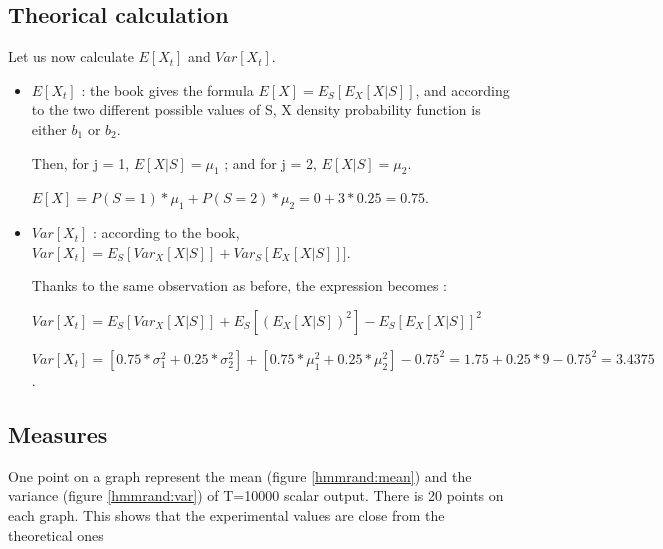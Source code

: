 \documentclass[a4paper]{report}
\begin{document}
\subsection{Theorical calculation}
Let us now calculate $E[X_{t}]$ and $Var[X_{t}]$.

\begin{itemize}
	\item 
	$E[X_{t}]$ : the book gives the formula $E[X]=E_{S}[E_{X}[X|S]]$, and according to the two different possible values of S, X density probability function is either $b_{1}$ or $b_{2}$.
	
	Then, for j = 1, $E[X|S]=\mu_{1}$ ;
	and for j = 2, $E[X|S]=\mu_{2}$.
	
	
	$E[X]=P(S=1)*\mu_{1} + P(S=2)*\mu_{2} = 0 + 3*0.25 = 0.75$.
	
\end{itemize}

\begin{itemize}
	\item $Var[X_{t}]$ : according to the book, $Var[X_{t}]=E_{S}[Var_{X}[X|S]] + Var_{S}[E_{X}[X|S]]]$.
	
	Thanks to the same observation as before, the expression becomes :
	
	$Var[X_{t}]=E_{S}[Var_{X}[X|S]] + E_{S}[(E_{X}[X|S])^2] - E_{S}[E_{X}[X|S] ]^2$
	
	$Var[X_{t}]=[0.75 * \sigma_{1}^2 + 0.25*\sigma_{2}^2] + [0.75*\mu_{1}^2+0.25*\mu_{2}^2] - 0.75^2 = 1.75+0.25*9-0.75^2=3.4375$.
\end{itemize}
\pagebreak
\subsection{Measures}
One point on a graph represent the mean (figure \ref{hmmrand:mean}) and the variance (figure  \ref{hmmrand:var}) of T=10000 scalar output. There is 20 points on each graph.  This shows that the experimental values are close from the theoretical ones
\end{document}
